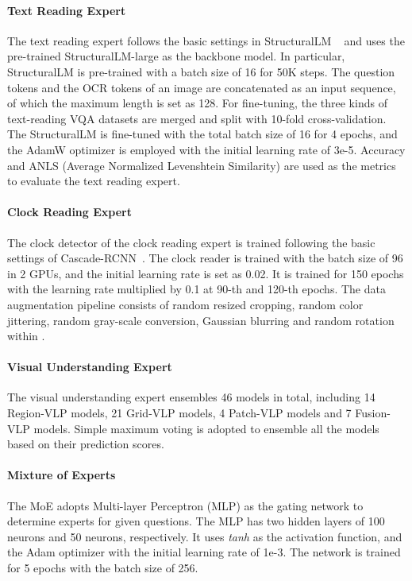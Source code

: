 \paragraph{Text Reading Expert} The text reading expert follows the basic settings in StructuralLM ~\citep{structurallm} and uses the pre-trained StructuralLM-large as the backbone model. In particular, StructuralLM is pre-trained with a batch size of 16 for 50K steps. The question tokens and the OCR tokens of an image are concatenated as an input sequence, of which the maximum length is set as 128. For fine-tuning, the three kinds of text-reading VQA datasets are merged and split with 10-fold cross-validation. The StructuralLM is fine-tuned with the total batch size of 16 for 4 epochs, and the AdamW optimizer is employed with the initial learning rate of 3e-5. Accuracy and ANLS (Average Normalized Levenshtein Similarity) are used as the metrics to evaluate the text reading expert.

\paragraph{Clock Reading Expert}
The clock detector of the clock reading expert is trained following the basic settings of Cascade-RCNN~\citep{cai2018cascade}. The clock reader is trained with the batch size of 96 in 2 GPUs, and the initial learning rate is set as 0.02. It is trained for 150 epochs with the learning rate multiplied by 0.1 at 90-th and 120-th epochs. The data augmentation pipeline consists of  random resized cropping, random color jittering, random gray-scale conversion, Gaussian blurring and random rotation within .
        

\paragraph{Visual Understanding Expert} The visual understanding expert ensembles 46 models in total, including 14 Region-VLP models, 21 Grid-VLP models, 4 Patch-VLP models and 7 Fusion-VLP models. Simple maximum voting is adopted to ensemble all the models based on their prediction scores.

\paragraph{Mixture of Experts} The MoE adopts Multi-layer Perceptron (MLP) as the gating network to determine experts for given questions. The MLP has two hidden layers of 100 neurons and 50 neurons, respectively. It uses \emph{tanh} as the activation function, and the Adam optimizer with the initial learning rate of 1e-3. The network is trained for 5 epochs with the batch size of 256.



